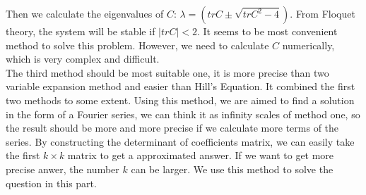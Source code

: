\documentclass{article}
\begin{document}
Then we calculate the eigenvalues of $C$: $\lambda = (trC \pm \sqrt{trC^2-4})$. From Floquet theory, the system will be stable if $|trC| < 2$. It seems to be most convenient method to solve this problem. However, we need to calculate $C$ numerically, which is very complex and difficult.\\
 
 The third method should be most suitable one, it is more precise than two variable expansion method and easier than Hill's Equation. It combined the first two methods to some extent. Using this method, we are aimed to find a solution in the form of a Fourier series, we can think it as infinity scales of method one, so the result should be more and more precise if we calculate more terms of the series. By constructing the determinant of coefficients matrix, we can easily take the first $k \times k$ matrix to get a approximated answer. If we want to get more precise anwer, the number $k$ can be larger. We use this method to solve the question in this part.
 
\end{document}
